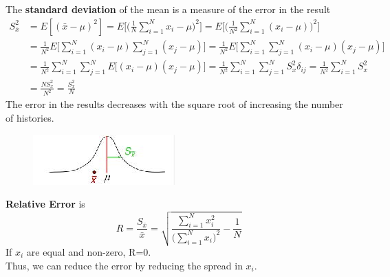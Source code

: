 \documentclass[12pt]{article}
\begin{document}
The \textbf{standard deviation} of the mean is a measure of the error in the result
\begin{align*}
S_{\bar{x}}^2 &= E[(\bar{x} - \mu)^2] = E\biggl[ \biggl(\frac{1}{N}\sum_{i=1}^N x_i - \mu\biggr)^2\biggr] = E\biggl[ \biggl(\frac{1}{N^2}\sum_{i=1}^N (x_i - \mu)\biggr)^2\biggr]\\
%
&=\frac{1}{N^2} E\biggl[ \sum_{i=1}^N (x_i - \mu) \sum_{j=1}^N (x_j - \mu)\biggr] = \frac{1}{N^2} E\biggl[ \sum_{i=1}^N \sum_{j=1}^N (x_i - \mu)  (x_j - \mu)\biggr]\\
%
&= \frac{1}{N^2} \sum_{i=1}^N \sum_{j=1}^N E\bigl[  (x_i - \mu)  (x_j - \mu)\bigr] = \frac{1}{N^2} \sum_{i=1}^N \sum_{j=1}^N S^2_x \delta_{ij} = \frac{1}{N^2} \sum_{i=1}^N S_x^2 \\
%
&= \frac{N S_x^2}{N^2} = \boxed{\frac{S_x^2}{N}}
\end{align*}
The error in the results decreases with the square root of increasing the number of histories.
%
\begin{figure}[h!]
\begin{center}
  \includegraphics[height=1 in,clip]{../figs/gaussian.jpg}
\end{center}
  \label{fig:gaussian}
\end{figure}

\textbf{Relative Error} is 
\[
R = \frac{S_{\bar{x}}}{\bar{x}} = \sqrt{\frac{\sum_{i=1}^N x_i^2}{\bigl(\sum_{i=1}^N x_i\bigr)^2} - \frac{1}{N}} 
\]
If $x_i$ are equal and non-zero, R=0.\\
Thus, we can reduce the error by reducing the spread in $x_i$.
\end{document}
